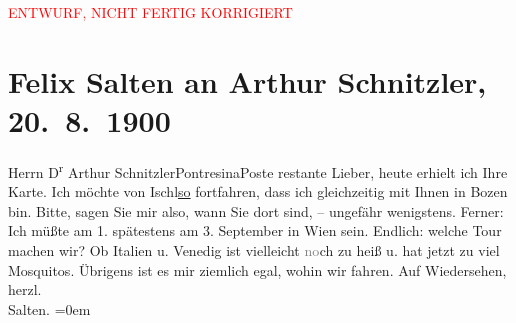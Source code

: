 
\begin{center}
            \textcolor{red}{ENTWURF, NICHT FERTIG KORRIGIERT}
                      \end{center}
            
         \renewcommand{\erwaehnteOrte}{Orte: Bad Ischl, Bozen, Italien, Pontresina, Strobl, Venedig, Wien}
         \renewcommand{\erwaehnteWerke}{}
               \section[Felix Salten an Arthur Schnitzler, 20. 8. 1900]{ Felix Salten an Arthur Schnitzler, 20. 8. 1900}\nopagebreak{}\rehead{ }\begin{ledgroupsized}[t]{13cm}\normalsize\beginnumbering \toendnotes[C]{\smallbreak\pagebreak[2]} 
\pstart{}{\pb}Herrn D\textsuperscript{r} Arthur Schnitzler\pend{}\pstart{}Pontresina\pend{}\pstart{}Poste restante\pend{}{\bigskip}\pstart
           \noindent{}{\pb}Lieber, heute erhielt ich Ihre Karte. Ich möchte von Ischl\uline{so} fortfahren, dass ich gleichzeitig mit Ihnen in Bozen bin. Bitte, sagen Sie mir also, wann Sie
               dort sind, – ungefähr wenigstens. Ferner: Ich müßte am 1. spätestens am
                  3. September in Wien sein.
               Endlich: welche Tour machen wir? Ob Italien u.
                  Venedig ist vielleicht \textcolor{gray}{no}ch
               zu heiß u. hat jetzt zu viel Mosquitos. Übrigens ist es mir ziemlich egal, wohin wir
               fahren. \pend
           \pstart
           Auf Wiedersehen, {\\[\baselineskip]}herzl. {\\[\baselineskip]}\spacefill\mbox{Salten.}\pend
           \leftskip=0em{}
         
         \endnumbering{}\end{ledgroupsized}\begin{anhang}\end{anhang}\newcommand{\dateiname}{L03312}\newcommand{\titel}{Felix Salten an Arthur Schnitzler, 20. 8. 1900}\newcommand{\editorInnen}{Martin Anton Müller und Laura Untner}
      